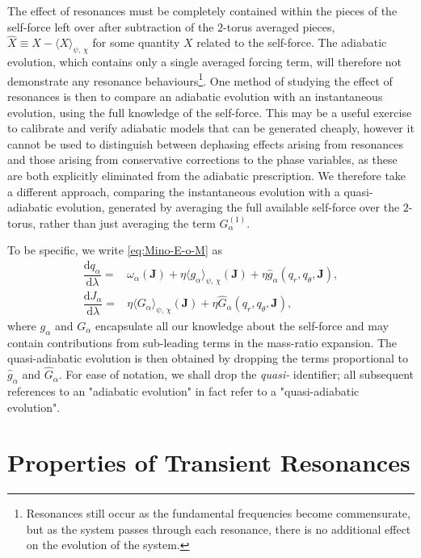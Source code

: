 \documentclass[aps,prd,amsfonts,amssymb,amsmath,nofootinbib,reprint,showpacs]{revtex4}
\newcommand{\dd}{\ensuremath{\mathrm{d}}}
\newcommand{\diff}[2]{\ensuremath{\dfrac{\dd {#1}}{\dd {#2}}}}
\begin{document}
The effect of resonances must be completely contained within the pieces of the self-force left over after subtraction of the $2$-torus averaged pieces, $\hat{X}\equiv X-\langle X\rangle_{\psi,\,\chi}$ for some quantity $X$ related to the self-force. The adiabatic evolution, which contains only a single averaged forcing term, will therefore not demonstrate any resonance behaviours\footnote{Resonances still occur as the fundamental frequencies become commensurate, but as the system passes through each resonance, there is no additional effect on the evolution of the system.}. One method of studying the effect of resonances is then to compare an adiabatic evolution with an instantaneous evolution, using the full knowledge of the self-force. This may be a useful exercise to calibrate and verify adiabatic models that can be generated cheaply, however it cannot be used to distinguish between dephasing effects arising from resonances and those arising from conservative corrections to the phase variables, as these are both explicitly eliminated from the adiabatic prescription. We therefore take a different approach, comparing the instantaneous evolution with a quasi-adiabatic evolution, generated by averaging the full available self-force over the $2$-torus, rather than just averaging the term $G_\alpha^{(1)}$.

To be specific, we write \ref{eq:Mino-E-o-M} as
\begin{subequations}
\begin{align}
\label{eq:Mino-E-o-M2}
\diff{q_\alpha}{\lambda} = {} & \omega_\alpha(\boldsymbol{J}) + \eta \langle g_\alpha\rangle_{\psi,\,\chi}(\boldsymbol{J}) + \eta \hat{g}_\alpha(q_r,q_\theta,\boldsymbol{J}), \\
\diff{J_\alpha}{\lambda} = {} & \eta \langle G_\alpha\rangle_{\psi,\,\chi}(\boldsymbol{J}) + \eta \hat{G}_\alpha(q_r,q_\theta,\boldsymbol{J}),
\end{align}
\end{subequations}
where $g_\alpha$ and $G_\alpha$ encapsulate all our knowledge about the self-force and may contain contributions from sub-leading terms in the mass-ratio expansion. The quasi-adiabatic evolution is then obtained by dropping the terms proportional to $\hat{g}_\alpha$ and $\hat{G}_\alpha$. For ease of notation, we shall drop the \emph{quasi-} identifier; all subsequent references to an "adiabatic evolution" in fact refer to a "quasi-adiabatic evolution".


\section{Properties of Transient Resonances}
\end{document}

